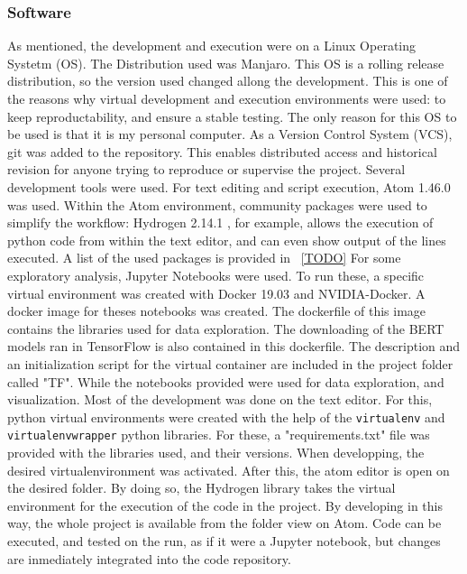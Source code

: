 \subsubsection{Software}\label{subs:Software}
As mentioned, the development and execution were on a Linux Operating Systetm (OS). The Distribution used was Manjaro. This OS is a rolling release distribution, so the version used changed allong the development. This is one of the reasons why virtual development and execution environments were used: to keep reproductability, and ensure a stable testing. The only reason for this OS to be used is that it is my personal computer.
As a Version Control System (VCS), git was added to the repository. This enables distributed access and historical revision for anyone trying to reproduce or supervise the project.
Several development tools were used. For text editing and script execution, Atom 1.46.0 \cite{TODO} was used. Within the Atom environment, community packages were used to simplify the workflow: Hydrogen 2.14.1 \cite{TODO}, for example, allows the execution of python code from within the text editor, and can even show output of the lines executed. A list of the used packages is provided in~ \ref{TODO}
For some exploratory analysis, Jupyter Notebooks \cite{TODO} were used. To run these, a specific virtual environment was created with Docker 19.03 \cite{TODO} and NVIDIA-Docker. A docker image for theses notebooks was created. The dockerfile of this image contains the libraries used for data exploration. The downloading of the BERT models ran in TensorFlow is also contained in this dockerfile. The description and an initialization script for the virtual container are included in the project folder called "TF".
While the notebooks provided were used for data exploration, and visualization. Most of the development was done on the text editor. For this, python virtual environments were created with the help of the \lstinline{virtualenv} and \lstinline{virtualenvwrapper} python libraries. For these, a "requirements.txt" file was provided with the libraries used, and their versions.
When developping, the desired virtualenvironment was activated. After this, the atom editor is open on the desired folder. By doing so, the Hydrogen library takes the virtual environment for the execution of the code in the project.
By developing in this way, the whole project is available from the folder view on Atom. Code can be executed, and tested on the run, as if it were a Jupyter notebook, but changes are inmediately integrated into the code repository.
